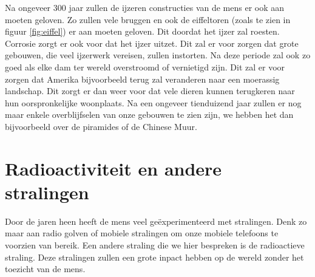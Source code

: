 \newline
Na ongeveer 300 jaar zullen de ijzeren constructies van de mens er ook aan moeten geloven. Zo zullen vele bruggen en ook de eiffeltoren (zoals te zien in figuur \ref{fig:eiffel}) er aan moeten geloven. Dit doordat het ijzer zal roesten. Corrosie zorgt er ook voor dat het ijzer uitzet. Dit zal er voor zorgen dat grote gebouwen, die veel ijzerwerk vereisen, zullen instorten. Na deze periode zal ook zo goed als elke dam ter wereld overstroomd of vernietigd zijn. Dit zal er voor zorgen dat Amerika bijvoorbeeld terug zal veranderen naar een moerassig landschap. Dit zorgt er dan weer voor dat vele dieren kunnen terugkeren naar hun oorspronkelijke woonplaats.
\newline
Na een ongeveer tienduizend jaar zullen er nog maar enkele overblijfselen van onze gebouwen te zien zijn, we hebben het dan bijvoorbeeld over de piramides of de Chinese Muur. \cite{LAPOutbreak}

\newpage

\section{Radioactiviteit en andere stralingen}
Door de jaren heen heeft de mens veel ge\"{e}xperimenteerd met stralingen. Denk zo maar aan radio golven of mobiele stralingen om onze mobiele telefoons te voorzien van bereik. Een andere straling die we hier bespreken is de radioactieve straling. Deze stralingen zullen een grote inpact hebben op de wereld zonder het toezicht van de mens.
